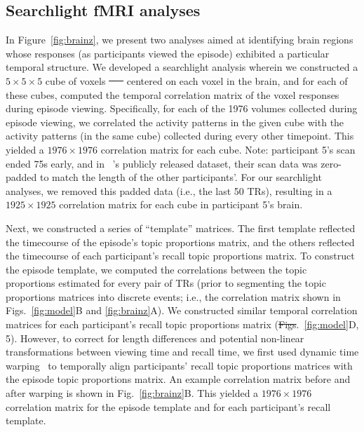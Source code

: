 \documentclass[10pt]{article}
\renewcommand{\includegraphics}[2][]{} %
\newcommand{\corrmats}{5} %
\providecommand{\DIFaddtex}[1]{{\protect\color{blue}\uwave{#1}}} %
\providecommand{\DIFdeltex}[1]{{\protect\color{red}\sout{#1}}}                      %
\providecommand{\DIFaddbegin}{} %
\providecommand{\DIFaddend}{} %
\providecommand{\DIFdelbegin}{} %
\providecommand{\DIFdelend}{} %
\providecommand{\DIFadd}[1]{\texorpdfstring{\DIFaddtex{#1}}{#1}} %
\providecommand{\DIFdel}[1]{\texorpdfstring{\DIFdeltex{#1}}{}} %
\newcommand{\DIFscaledelfig}{0.5}
\newlength{\DIFdelgraphicswidth} %
\newlength{\DIFdelgraphicsheight} %
\newcommand{\DIFaddincludegraphics}[2][]{{\color{blue}\fbox{\DIFOincludegraphics[#1]{#2}}}} %
\newcommand{\DIFdelincludegraphics}[2][]{%
\sbox{\DIFdelgraphicsbox}{\DIFOincludegraphics[#1]{#2}}%
\settoboxwidth{\DIFdelgraphicswidth}{\DIFdelgraphicsbox} %
\settoboxtotalheight{\DIFdelgraphicsheight}{\DIFdelgraphicsbox} %
\scalebox{\DIFscaledelfig}{%
\parbox[b]{\DIFdelgraphicswidth}{\usebox{\DIFdelgraphicsbox}\\[-\baselineskip] \rule{\DIFdelgraphicswidth}{0em}}\llap{\resizebox{\DIFdelgraphicswidth}{\DIFdelgraphicsheight}{%
\setlength{\unitlength}{\DIFdelgraphicswidth}%
\begin{picture}(1,1)%
\thicklines\linethickness{2pt} %
{\color[rgb]{1,0,0}\put(0,0){\framebox(1,1){}}}%
{\color[rgb]{1,0,0}\put(0,0){\line( 1,1){1}}}%
{\color[rgb]{1,0,0}\put(0,1){\line(1,-1){1}}}%
\end{picture}%
}\hspace*{3pt}}} %
} %
\DeclareRobustCommand{\DIFaddbegin}{\DIFOaddbegin \let\includegraphics\DIFaddincludegraphics} %
\DeclareRobustCommand{\DIFaddend}{\DIFOaddend \let\includegraphics\DIFOincludegraphics} %
\DeclareRobustCommand{\DIFdelbegin}{\DIFOdelbegin \let\includegraphics\DIFdelincludegraphics} %
\DeclareRobustCommand{\DIFdelend}{\DIFOaddend \let\includegraphics\DIFOincludegraphics} %
\begin{document}
\subsection*{Searchlight fMRI analyses}
In Figure~\ref{fig:brainz}, we present two analyses aimed at identifying brain regions whose responses (as participants viewed the episode) exhibited a particular temporal structure.  We developed a searchlight analysis wherein we constructed a $5 \times 5 \times 5$ cube of voxels \DIFdelbegin \DIFdel{~\mbox{%
\citep[following][]{ChenEtal17} }\hspace{0pt}%
}\DIFdelend centered on each voxel in the brain\DIFaddbegin \DIFadd{~\mbox{%
\citep{ChenEtal17}}\hspace{0pt}%
}\DIFaddend , and for each of these cubes, computed the temporal correlation matrix of the voxel responses during episode viewing.  Specifically, for each of the 1976 volumes collected during episode viewing, we correlated the activity patterns in the given cube with the activity patterns (in the same cube) collected during every other timepoint.  This yielded a $1976 \times 1976$ correlation matrix for each cube.  Note: participant 5's scan ended 75s early, and in \DIFaddbegin \DIFadd{Chen et al. (2017)}\DIFaddend ~\cite{ChenEtal17}'s publicly released dataset, their scan data was zero-padded to match the length of the other participants'.  For our searchlight analyses, we removed this padded data (i.e., the last 50 TRs), resulting in a $1925 \times 1925$ correlation matrix for each cube in participant 5's brain.

Next, we constructed a series of ``template'' matrices.  The first template reflected the timecourse of the episode's topic proportions matrix, and the others reflected the timecourse of each participant's recall topic proportions matrix.  To construct the episode template, we computed the correlations between the topic proportions estimated for every pair of TRs (prior to segmenting the topic proportions matrices into discrete events; i.e., the correlation matrix shown in Figs.~\ref{fig:model}B and \ref{fig:brainz}A).  We constructed similar temporal correlation matrices for each participant's recall topic proportions matrix (\DIFdelbegin \DIFdel{Figs}\DIFdelend \DIFaddbegin \DIFadd{Fig}\DIFaddend .~\ref{fig:model}D, \DIFaddbegin \DIFadd{Supp.\ Fig.~}\DIFaddend \corrmats).  However, to correct for length differences and potential non-linear transformations between viewing time and recall time, we first used dynamic time warping~\citep{BernClif94} to temporally align participants' recall topic proportions matrices with the episode topic proportions matrix.  An example correlation matrix before and after warping is shown in Fig.~\ref{fig:brainz}B.  This yielded a $1976 \times 1976$ correlation matrix for the episode template and for each participant's recall template.
\end{document}
